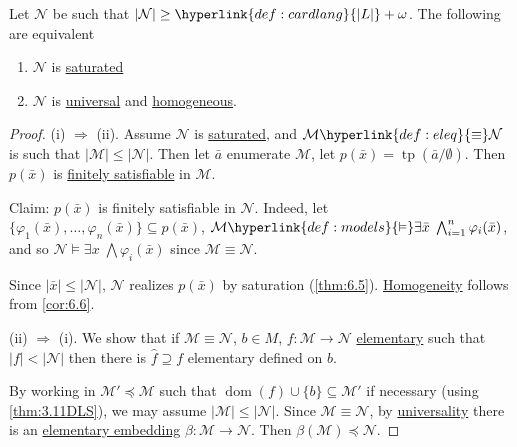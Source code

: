 \documentclass{article}
\let\models\vDash
\DeclareMathOperator{\dom}{dom}
\DeclareMathOperator{\tp}{tp}
\begin{document}
\begin{nthm}\label{thm:6.10}
  Let $\mathcal{N}$ be such that $|\mathcal{N}| \geq \hyperlink{def:cardlang}{|L|} + \omega$. The following are equivalent
  \begin{enumerate}[label=(\roman*)]
    \item $\mathcal{N}$ is \hyperlink{def:sat}{saturated}
    \item $\mathcal{N}$ is \hyperlink{def:univ}{universal} and \hyperlink{def:homogeneous}{homogeneous}.
  \end{enumerate}
\end{nthm}
\begin{proof}
  (i) $\Rightarrow$ (ii). Assume $\mathcal{N}$ is \hyperlink{def:sat}{saturated}, and $\mathcal{M} \hyperlink{def:eleq}{\equiv} \mathcal{N}$ is such that $|\mathcal{M}| \leq |\mathcal{N}|$.
  Then let $\bar{a}$ enumerate $\mathcal{M}$, let $p(\bar{x}) = \tp(\bar{a}/\emptyset)$.
  Then $p(\bar{x})$ is \hyperlink{def:type}{finitely satisfiable} in $\mathcal{M}$.

  Claim: $p(\bar{x})$ is finitely satisfiable in $\mathcal{N}$.
  Indeed, let $\{\varphi_1(\bar{x}), \dotsc, \varphi_n(\bar{x})\} \subseteq p(\bar{x})$, $\mathcal{M} \hyperlink{def:models}{\models} \exists \bar{x} \; \bigwedge _{i=1}^n \varphi_i(\bar{x})$, and so $\mathcal{N} \models \exists x \; \bigwedge \varphi_i(\bar{x})$ since $\mathcal{M} \equiv \mathcal{N}$.

  Since $|\bar{x}| \leq |\mathcal{N}|$, $\mathcal{N}$ realizes $p(\bar{x})$ by saturation (\cref{thm:6.5}).
  \hyperlink{def:homogeneous}{Homogeneity} follows from \cref{cor:6.6}.

  (ii) $\Rightarrow$ (i). We show that if $\mathcal{M} \equiv \mathcal{N}$, $b \in M$, $f: \mathcal{M} \to \mathcal{N}$ \hyperlink{def:elmap}{elementary} such that $|f| < |\mathcal{N}|$ then there is $\hat{f} \supseteq f$ elementary defined on $b$.

  By working in $\mathcal{M}' \preccurlyeq \mathcal{M}$ such that $\dom(f) \cup \{b\} \subseteq \mathcal{M}'$ if necessary (using \cref{thm:3.11DLS}), we may assume $|\mathcal{M}| \leq |\mathcal{N}|$.
  Since $\mathcal{M} \equiv \mathcal{N}$, by \hyperlink{def:univ}{universality} there is an \hyperlink{def:el}{elementary embedding} $\beta: \mathcal{M} \to \mathcal{N}$. Then $\beta(\mathcal{M}) \preccurlyeq \mathcal{N}$.


\end{proof}
\end{document}

